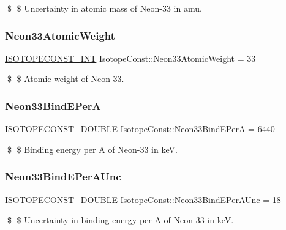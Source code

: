 \$ \$ Uncertainty in atomic mass of Neon-\/33 in amu. \mbox{\label{group___isotope_const-_neon-_ne33_ga6c977787cbf62aa63bbeb7d6d676a5e8}} 
\subsubsection{\texorpdfstring{Neon33\+Atomic\+Weight}{Neon33AtomicWeight}}
{\footnotesize\ttfamily \mbox{\hyperlink{group___isotope_const-_macros_ga5f18360b3e99483a35c32d789e62621c}{I\+S\+O\+T\+O\+P\+E\+C\+O\+N\+S\+T\+\_\+\+I\+NT}} Isotope\+Const\+::\+Neon33\+Atomic\+Weight = 33}

\$ \$ Atomic weight of Neon-\/33. \mbox{\label{group___isotope_const-_neon-_ne33_ga8b512f5fe624d2157e9384713e77af8e}} 
\subsubsection{\texorpdfstring{Neon33\+Bind\+E\+PerA}{Neon33BindEPerA}}
{\footnotesize\ttfamily \mbox{\hyperlink{group___isotope_const-_macros_ga8f45a7272ce02c0b4c65c44636ed719a}{I\+S\+O\+T\+O\+P\+E\+C\+O\+N\+S\+T\+\_\+\+D\+O\+U\+B\+LE}} Isotope\+Const\+::\+Neon33\+Bind\+E\+PerA = 6440}

\$ \$ Binding energy per A of Neon-\/33 in keV. \mbox{\label{group___isotope_const-_neon-_ne33_ga7453c551ad227923fb7df389d00a89f8}} 
\subsubsection{\texorpdfstring{Neon33\+Bind\+E\+Per\+A\+Unc}{Neon33BindEPerAUnc}}
{\footnotesize\ttfamily \mbox{\hyperlink{group___isotope_const-_macros_ga8f45a7272ce02c0b4c65c44636ed719a}{I\+S\+O\+T\+O\+P\+E\+C\+O\+N\+S\+T\+\_\+\+D\+O\+U\+B\+LE}} Isotope\+Const\+::\+Neon33\+Bind\+E\+Per\+A\+Unc = 18}

\$ \$ Uncertainty in binding energy per A of Neon-\/33 in keV. \mbox{\label{group___isotope_const-_neon-_ne33_ga2a1142284ade61e9b294294902edfd26}} 
